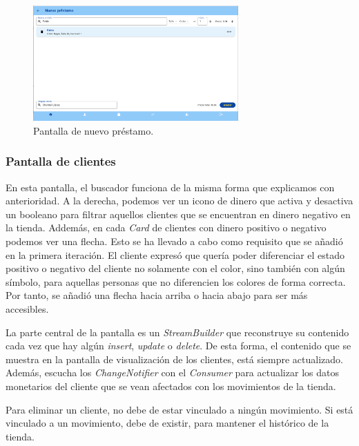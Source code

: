 \begin{figure}[H]
	\centering
	\includegraphics[width=0.7\textwidth]{imagenes/TerceraIteracion/nuevoPrestamo.png}
	\caption{Pantalla de nuevo préstamo.}
\end{figure}

\newpage

\subsubsection{Pantalla de clientes}

En esta pantalla, el buscador funciona de la misma forma que explicamos con anterioridad. A la derecha, podemos ver un icono de dinero que activa y desactiva un booleano para filtrar aquellos clientes que se encuentran en dinero negativo en la tienda. Addemás, en cada \textit{Card} de clientes con dinero positivo o negativo podemos ver una flecha. Esto se ha llevado a cabo como requisito que se añadió en la primera iteración. El cliente expresó que quería poder diferenciar el estado positivo o negativo del cliente no solamente con el color, sino también con algún símbolo, para aquellas personas que no diferencien los colores de forma correcta. Por tanto, se añadió una flecha hacia arriba o hacia abajo para ser más accesibles. 

La parte central de la pantalla es un \textit{StreamBuilder} que reconstruye su contenido cada vez que hay algún \textit{insert}, \textit{update} o \textit{delete}. De esta forma, el contenido que se muestra en la pantalla de visualización de los clientes, está siempre actualizado. Además, escucha los \textit{ChangeNotifier} con el \textit{Consumer} para actualizar los datos monetarios del cliente que se vean afectados con los movimientos de la tienda. 

Para eliminar un cliente, no debe de estar vinculado a ningún movimiento. Si está vinculado a un movimiento, debe de existir, para mantener el histórico de la tienda. 

